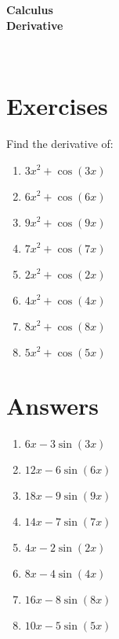 

\begin{centering}
\bf{ \Large  Calculus \\
Derivative \\
}
\end{centering}
\ 
\section{Exercises}
Find the derivative of:
\begin{enumerate}
    \item $3 x^{2} + \cos{\left(3 x \right)}$  \item $6 x^{2} + \cos{\left(6 x \right)}$  \item $9 x^{2} + \cos{\left(9 x \right)}$  \item $7 x^{2} + \cos{\left(7 x \right)}$  \item $2 x^{2} + \cos{\left(2 x \right)}$  \item $4 x^{2} + \cos{\left(4 x \right)}$  \item $8 x^{2} + \cos{\left(8 x \right)}$  \item $5 x^{2} + \cos{\left(5 x \right)}$
\end{enumerate}
\section{Answers}
\begin{enumerate}
    \item $6 x - 3 \sin{\left(3 x \right)}$  \item $12 x - 6 \sin{\left(6 x \right)}$  \item $18 x - 9 \sin{\left(9 x \right)}$  \item $14 x - 7 \sin{\left(7 x \right)}$  \item $4 x - 2 \sin{\left(2 x \right)}$  \item $8 x - 4 \sin{\left(4 x \right)}$  \item $16 x - 8 \sin{\left(8 x \right)}$  \item $10 x - 5 \sin{\left(5 x \right)}$
\end{enumerate}







